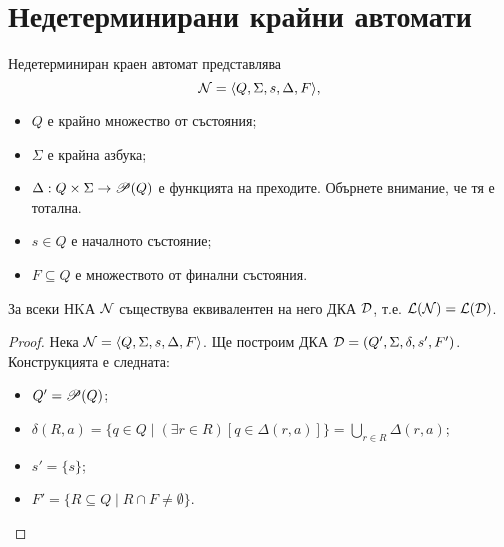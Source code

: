 \section{Недетерминирани крайни автомати}
\begin{dfn}
  Недетерминиран краен автомат представлява
  \[\mathcal{N} = \langle{Q,\Sigma,s,\Delta,F}\rangle,\]
  \begin{itemize}
  \item
    $Q$ е крайно множество от състояния;
  \item
    $\Sigma$ е крайна азбука;
  \item
    $\Delta: Q\times\Sigma \to \mathscr{P}(Q)$ е функцията на преходите.
    Обърнете внимание, че тя е тотална.
  \item
    $s \in Q$ е началното състояние;
  \item
    $F\subseteq Q$ е множеството от финални състояния.
  \end{itemize}
\end{dfn}

\begin{thm}
  За всеки НKА $\mathcal{N}$ съществува еквивалентен на него ДКА $\mathcal{D}$, т.е. $\mathcal{L}(\mathcal{N}) = \mathcal{L}(\mathcal{D})$.
\end{thm}
\begin{proof}
  Нека $\mathcal{N} = \langle{Q,\Sigma,s,\Delta,F}\rangle$. Ще построим ДКА $\mathcal{D} = (Q',\Sigma,\delta,s',F')$.
  Конструкцията е следната:
  \begin{itemize}
  \item
    $Q' = \mathscr{P}(Q)$;
  \item
    $\delta(R,a) = \{q\in Q\mid (\exists r\in R)[q\in\Delta(r,a)]\} = \bigcup_{r\in R}\Delta(r,a)$;
  \item
    $s' = \{s\}$;
  \item
    $F' = \{R \subseteq Q \mid R\cap F \neq \emptyset\}$.
  \end{itemize}
\end{proof}


